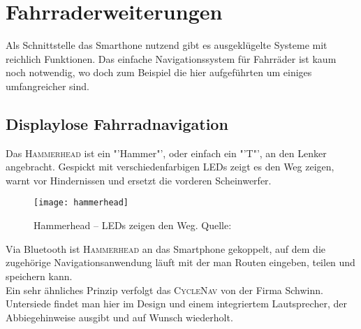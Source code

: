 \section{Fahrraderweiterungen}
Als Schnittstelle das Smarthone nutzend gibt es ausgeklügelte Systeme mit reichlich Funktionen. Das einfache Navigationssystem für Fahrräder ist kaum noch notwendig, wo doch zum Beispiel die hier aufgeführten um einiges umfangreicher sind.
\subsection{Displaylose Fahrradnavigation}
Das \textsc{Hammerhead} ist ein "'Hammer"', oder einfach ein "'T"', an den Lenker angebracht. Gespickt mit verschiedenfarbigen \glspl{LED} zeigt es den Weg zeigen, warnt vor Hindernissen und ersetzt die vorderen Scheinwerfer.
\begin{figure}[H]
    \centering
    \texttt{[image: hammerhead]}
    \caption[Hammerhead]{Hammerhead -- \glspl{LED} zeigen den Weg.  Quelle: \cite{Hammerhead}} 
    \label{fig:hammerhead}
\end{figure}
Via Bluetooth ist \textsc{Hammerhead} an das Smartphone gekoppelt, auf dem die zugehörige Navigationsanwendung läuft mit der man Routen eingeben, teilen und speichern kann\cite{Hammerhead}.\\
Ein sehr ähnliches Prinzip verfolgt das \textsc{CycleNav} von der Firma Schwinn. Untersiede findet man hier im Design und einem integriertem Lautsprecher, der Abbiegehinweise ausgibt und auf Wunsch wiederholt\cite{CycleNav}.
